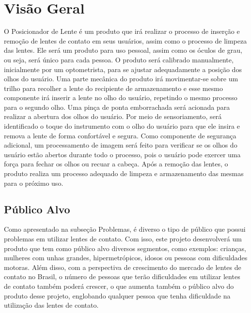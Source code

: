 \section[Visão Geral]{Visão Geral}

O Posicionador de Lente é um produto que irá realizar o processo de inserção e remoção de lentes de contato em seus usuários, assim como o processo de limpeza das lentes. Ele será um produto para uso pessoal, assim como os óculos de grau, ou seja, será único para cada pessoa. O produto será calibrado manualmente, inicialmente por um optometrista,  para se ajustar adequadamente a posição dos olhos do usuário. Uma parte mecânica do produto irá movimentar-se sobre um trilho para recolher a lente do recipiente de armazenamento e esse mesmo componente irá inserir a lente no olho do usuário, repetindo o mesmo processo para o segundo olho. Uma pinça de ponta emborrachada será acionada para realizar a abertura dos olhos do usuário. Por meio de sensoriamento, será identificado o toque do instrumento com o olho do usuário para que ele insira e remova a lente de forma confortável e segura. Como componente de segurança adicional, um processamento de imagem será feito para verificar se os olhos do usuário estão abertos durante todo o processo, pois o usuário pode exercer uma força para fechar os olhos ou recuar a cabeça. Após a remoção das lentes, o produto realiza um processo adequado de limpeza e armazenamento das mesmas para o próximo uso.

\subsection[Público Alvo]{Público Alvo}

Como apresentado na subseção Problemas, é diverso o tipo de público que possui problemas em utilizar lentes de contato. Com isso, este projeto desenvolverá um produto que tem como público alvo diversos segmentos, como exemplos: crianças, mulheres com unhas grandes, hipermetrópicos, idosos ou pessoas com dificuldades motoras. Além disso, com a perspectiva de crescimento do mercado de lentes de contato no Brasil, o número de pessoas que terão dificuldades em utilizar lentes de contato também poderá crescer, o que aumenta também o público alvo do produto desse projeto, englobando qualquer pessoa que tenha dificuldade na utilização das lentes de contato.